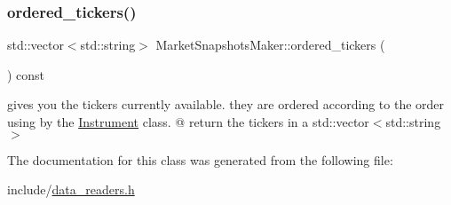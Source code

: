 \subsubsection{\texorpdfstring{ordered\+\_\+tickers()}{ordered\_tickers()}}
{\footnotesize\ttfamily std\+::vector$<$std\+::string$>$ Market\+Snapshots\+Maker\+::ordered\+\_\+tickers (\begin{DoxyParamCaption}{ }\end{DoxyParamCaption}) const}



gives you the tickers currently available. they are ordered according to the order using by the \hyperlink{classInstrument}{Instrument} class. @ return the tickers in a std\+::vector$<$std\+::string$>$ 



The documentation for this class was generated from the following file\+:\begin{DoxyCompactItemize}
\item 
include/\hyperlink{data__readers_8h}{data\+\_\+readers.\+h}\end{DoxyCompactItemize}
